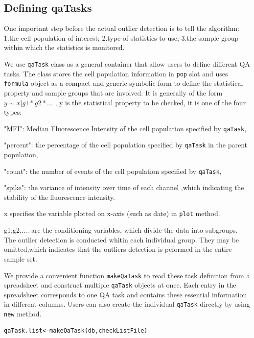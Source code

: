 \documentclass[10pt]{bmc_article}
\newenvironment{bmcformat}{\baselineskip20pt\sloppy\setboolean{publ}{false}}{\baselineskip20pt\sloppy}
\begin{document}
\begin{bmcformat}
\subsection{Defining qaTasks} 
One important step before the actual outlier detection is to tell the algorithm:
1.the cell population of interest;
2.type of statistics to use;
3.the sample group within which the statistics is monitored.
 
We use \texttt{qaTask} class as a general container that allow users to
define different QA tasks. The class stores the cell population information
in \texttt{pop} slot and uses \texttt{formula} object as a
compact and generic symbolic form to define the statistical property and sample
groups that are involved. It is generally of the form $y \sim x|g1*g2*...$ ,
y is the statistical property to be checked, it is one of the four types:
				
				"MFI": 
					Median Fluorescence Intensity of the cell population specified by \texttt{qaTask},
			
				"percent": 
						the percentage of the cell population specified by \texttt{qaTask} in the parent population, 
			
				"count": 
						the number of events of the cell population specified by \texttt{qaTask},
			
				"spike": 
						the variance of intensity over time of each channel ,which indicating the stability of the fluorescence intensity.

x specifies the variable plotted on x-axis (such as date) in \texttt{plot} method.

g1,g2,.... are the conditioning variables, which divide the data into subgroups. 
The outlier detection is conducted whitin each individual group. 
They may be omitted,which indicates that the outliers detection is peformed
in the entire sample set.

We provide a convenient function \texttt{makeQaTask} to read these task
definition from a spreadsheet and construct multiple \texttt{qaTask} objects at
once. Each entry in the spreadsheet corresponds to one QA task and contains these essential
information in different columns. Users can
also create the individual \texttt{qaTask} directly by using \texttt{new} method.

\begin{verbatim}
qaTask.list<-makeQaTask(db,checkListFile)
\end{verbatim}



\end{bmcformat}
\end{document}
